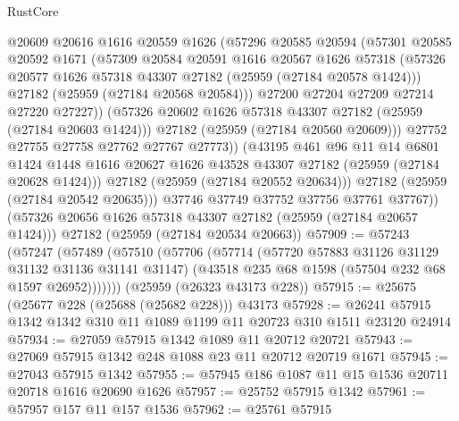 \begin{lexlean}{RustCore}
\begin{coremodule}
                  @20609
                  @20616
                  @1616
                  @20559
                  @1626
                  (@57296
                    @20585
                    @20594
                    (@57301
                      @20585
                      @20592
                      @1671
                      (@57309
                        @20584
                        @20591
                        @1616
                        @20567
                        @1626
                        @57318
                        (@57326 @20577 @1626 @57318 @43307 @27182 (@25959 (@27184 @20578 @1424)))
                        @27182
                        (@25959 (@27184 @20568 @20584)))
                      @27200
                      @27204
                      @27209
                      @27214
                      @27220
                      @27227))
                  (@57326 @20602 @1626 @57318 @43307 @27182 (@25959 (@27184 @20603 @1424)))
                  @27182
                  (@25959 (@27184 @20560 @20609)))
                @27752
                @27755
                @27758
                @27762
                @27767
                @27773))
            (@43195
              @461
              @96
              @11
              @14
              @6801
              @1424
              @1448
              @1616
              @20627
              @1626
              @43528
              @43307
              @27182
              (@25959 (@27184 @20628 @1424)))
            @27182
            (@25959 (@27184 @20552 @20634)))
          @27182
          (@25959 (@27184 @20542 @20635)))
        @37746
        @37749
        @37752
        @37756
        @37761
        @37767))
    (@57326 @20656 @1626 @57318 @43307 @27182 (@25959 (@27184 @20657 @1424)))
    @27182
    (@25959 (@27184 @20534 @20663))
@57909 := @57243
    (@57247
      (@57489
        (@57510
          (@57706
            (@57714
              (@57720 @57883 @31126 @31129 @31132 @31136 @31141 @31147)
              (@43518 @235 @68 @1598 (@57504 @232 @68 @1597 @26952)))))))
    (@25959 (@26323 @43173 @228))
@57915 := @25675 (@25677 @228 (@25688 (@25682 @228))) @43173
@57928 := @26241 @57915 @1342 @1342 @310 @11 @1089 @1199 @11 @20723 @310 @1511 @23120 @24914
@57934 := @27059 @57915 @1342 @1089 @11 @20712 @20721
@57943 := @27069 @57915 @1342 @248 @1088 @23 @11 @20712 @20719 @1671
@57945 := @27043 @57915 @1342
@57955 := @57945 @186 @1087 @11 @15 @1536 @20711 @20718 @1616 @20690 @1626
@57957 := @25752 @57915 @1342
@57961 := @57957 @157 @11 @157 @1536
@57962 := @25761 @57915

\end{coremodule}
\end{lexlean}
